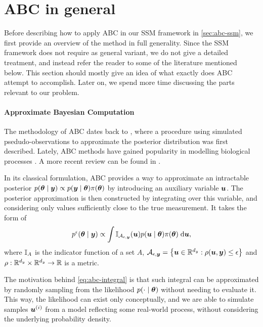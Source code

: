 \section{ABC in general} \label{sec:abc-general}
Before describing how to apply ABC in our SSM framework in \autoref{sec:abc-ssm}, we first provide an overview of the method in full generality. Since the SSM framework does not require as general variant, we do not give a detailed treatment, and instead refer the reader to some of the literature mentioned below. This section should mostly give an idea of what exactly does ABC attempt to accomplish. Later on, we spend more time discussing the parts relevant to our problem.

\paragraph{Approximate Bayesian Computation}
The methodology of ABC dates back to \cite{abc-old-old}, where a procedure using simulated psedudo-observations to approximate the posterior distribution was first described. Lately, ABC methods have gained popularity in modelling biological processes \citep{abc-old}. A more recent review can be found in \cite{abc-recent}.

In its classical formulation, ABC provides a way to approximate an intractable posterior $p(\bm{\theta} \mid \bm{y}) \propto p(\bm{y} \mid \bm{\theta}) \pi(\bm{\theta})$ by introducing an auxiliary variable $\bm{u}$. The posterior approximation is then constructed by integrating over this variable, and considering only values sufficiently close to the true measurement. It takes the form of
\begin{equation} \label{eq:abc-integral}
p^\epsilon(\bm{\theta} \mid \bm{y}) \propto \int \mathbb{I}_{\mathcal{A}_{\epsilon, \bm{y}}}(\bm{u}) p(\bm{u} \mid \bm{\theta}) \pi(\bm{\theta}) \; \mathrm{d}{\bm{u}},
\end{equation}
where $\mathbb{I}_A$ is the indicator function of a set $A$, $\mathcal{A}_{\epsilon, \bm{y}} = \left\{\bm{u} \in \mathbb{R}^{d_y} : \rho(\bm{u}, \bm{y}) \leq \epsilon \right\}$ and $\rho: \mathbb{R}^{d_y} \times \mathbb{R}^{d_y} \to \mathbb{R}$ is a metric.

The motivation behind \eqref{eq:abc-integral} is that such integral can be approximated by randomly sampling from the likelihood $p(\cdot \mid \bm{\theta})$ without needing to evaluate it. This way, the likelihood can exist only conceptually, and we are able to simulate samples $\bm{u}^{(i)}$ from a model reflecting some real-world process, without considering the underlying probability density.

